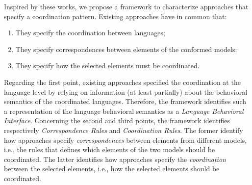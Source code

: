 Inspired by these works, we propose a framework to characterize approaches that specify a coordination pattern. Existing approaches have in common that:
\begin{enumerate}
	\item They specify the coordination between languages;
	
	\item They specify correspondences between elements of the conformed models;
	
	\item They specify how the selected elements must be coordinated.
\end{enumerate}	
Regarding the first point, existing approaches specified the coordination at the language level by relying on information (at least partially) about the behavioral semantics of the coordinated languages. Therefore, the framework identifies such a representation of the language behavioral semantics as a \emph{Language Behavioral Interface}. Concerning the second and third points, the framework identifies respectively \emph{Correspondence Rules} and \emph{Coordination Rules}. The former identify how approaches specify \emph{correspondences} between elements from different models, i.e., the rules that defines which elements of the two models should be coordinated.
The latter identifies how approaches specify the \emph{coordination} between the selected elements, i.e., how the selected elements should be coordinated.

